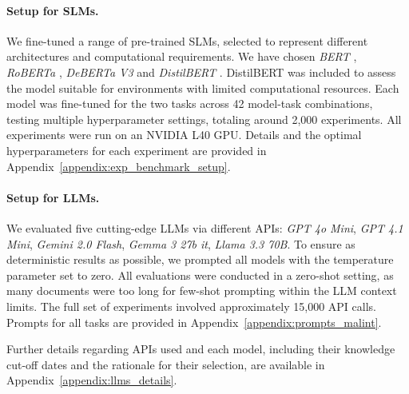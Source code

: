 \documentclass[11pt]{article}
\begin{document}
\paragraph{Setup for SLMs.}

We fine-tuned a range of pre-trained SLMs, selected to represent different architectures and computational requirements. We have chosen \textit{BERT} \cite{DBLP:journals/corr/abs-1810-04805}, \textit{RoBERTa} \cite{DBLP:journals/corr/abs-1907-11692}, \textit{DeBERTa V3} \cite{he2021deberta, he2021debertav3} and \textit{DistilBERT} \cite{Sanh2019DistilBERTAD}. DistilBERT was included to assess the model suitable for environments with limited computational resources.
Each model was fine-tuned for the two tasks across 42 model-task combinations, testing multiple hyperparameter settings, totaling around 2{,}000 experiments.  All experiments were run on an NVIDIA L40 GPU.
Details and the optimal hyperparameters for each experiment are provided in Appendix~\ref{appendix:exp_benchmark_setup}.

\paragraph{Setup for LLMs.}

We evaluated five cutting-edge LLMs via different APIs: \textit{GPT 4o Mini},
\textit{GPT 4.1 Mini}, \textit{Gemini 2.0 Flash}, \textit{Gemma 3 27b it}, \textit{Llama 3.3 70B}. To ensure as deterministic results as possible, we prompted all models with the temperature parameter set to zero. All evaluations were conducted in a zero-shot setting, as many documents were too long for few-shot prompting within the LLM context limits. The full set of experiments involved approximately 15,000 API calls. Prompts for all tasks are provided in Appendix~\ref{appendix:prompts_malint}. 

Further details regarding APIs used and each model, including their knowledge cut-off dates and the rationale for their selection, are available in Appendix~\ref{appendix:llms_details}.

\end{document}
